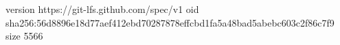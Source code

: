 version https://git-lfs.github.com/spec/v1
oid sha256:56d8896e18d77aef412ebd70287878effcbd1fa5a48bad5abebc603c2f86c7f9
size 5566
